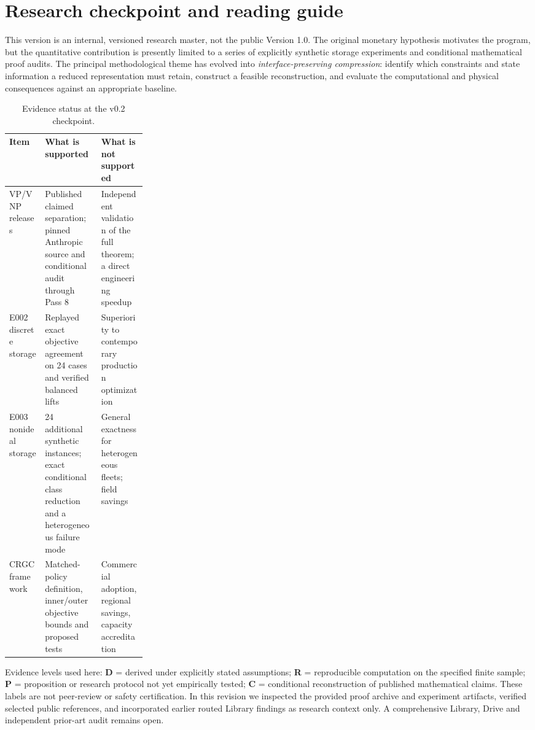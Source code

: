 \documentclass[11pt,letterpaper]{article}
\begin{document}
\section{Research checkpoint and reading guide}
\label{sec:checkpoint}
This version is an internal, versioned research master, not the public Version 1.0. The original monetary hypothesis motivates the program, but the quantitative contribution is presently limited to a series of explicitly synthetic storage experiments and conditional mathematical proof audits. The principal methodological theme has evolved into \emph{interface-preserving compression}: identify which constraints and state information a reduced representation must retain, construct a feasible reconstruction, and evaluate the computational and physical consequences against an appropriate baseline.

\begin{table}[htbp]
\small\centering
\caption{Evidence status at the v0.2 checkpoint.}
\begin{tabularx}{\linewidth}{p{0.26\linewidth}YY}
\toprule
Item & What is supported & What is not supported\\
\midrule
VP/VNP releases & Published claimed separation; pinned Anthropic source and conditional audit through Pass 8 & Independent validation of the full theorem; a direct engineering speedup\\
E002 discrete storage & Replayed exact objective agreement on 24 cases and verified balanced lifts & Superiority to contemporary production optimization\\
E003 nonideal storage & 24 additional synthetic instances; exact conditional class reduction and a heterogeneous failure mode & General exactness for heterogeneous fleets; field savings\\
CRGC framework & Matched-policy definition, inner/outer objective bounds and proposed tests & Commercial adoption, regional savings, capacity accreditation\\
\bottomrule
\end{tabularx}
\end{table}
\noindent Evidence levels used here: \textbf{D} = derived under explicitly stated assumptions; \textbf{R} = reproducible computation on the specified finite sample; \textbf{P} = proposition or research protocol not yet empirically tested; \textbf{C} = conditional reconstruction of published mathematical claims. These labels are not peer-review or safety certification. In this revision we inspected the provided proof archive and experiment artifacts, verified selected public references, and incorporated earlier routed Library findings as research context only. A comprehensive Library, Drive and independent prior-art audit remains open.
\end{document}
